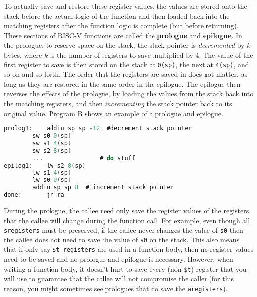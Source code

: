 \documentclass{article}
\begin{document}
To actually save and restore these register values, the values are stored onto the stack before the actual logic of the function and then loaded back into the matching registers after the function logic is complete (but before returning). These sections of RISC-V functions are called the \textbf{prologue} and \textbf{epilogue}. In the prologue, to reserve space on the stack, the stack pointer is \textit{decremented} by $k$ bytes, where $k$ is the number of registers to save multiplied by 4. The value of the first register to save is then stored on the stack at \texttt{0(sp)}, the next at \texttt{4(sp)}, and so on and so forth. The order that the registers are saved in does not matter, as long as they are restored in the same order in the epilogue. The epilogue then reverses the effects of the prologue, by loading the values from the stack back into the matching registers, and then \textit{incrementing} the stack pointer back to its original value. Program B shows an example of a prologue and epilogue.
\begin{center}
\renewcommand{\ttdefault}{pcr}
\begin{lstlisting}[language=C, basicstyle=\ttfamily, keywordstyle=\bfseries, showstringspaces=false, morekeywords={jal, addu, move, bne, j, sw, addiu, lw, jr}]
prolog1:  	addiu sp sp -12  #decrement stack pointer
		sw s0 0(sp)
		sw s1 4(sp)
		sw s2 8(sp)
		... 			   # do stuff
epilog1:	lw s2 8(sp)
		lw s1 4(sp)
		lw s0 0(sp)
		addiu sp sp 8  # increment stack pointer
done:		jr ra 
\end{lstlisting}
\end{center}
During the prologue, the callee need only save the register values of the registers that the callee will change during the function call. For example, even though all \texttt{sregisters} must be preserved, if the callee never changes the value of \texttt{s0} then the callee does not need to save the value of \texttt{s0} on the stack. This also means that if only say \texttt{\$t registers} are used in a function body, then no register values need to be saved and no prologue and epilogue is necessary. However, when writing a function body, it doesn't hurt to save every (non \texttt{\$t}) register that you will use to guarantee that the callee will not compromise the caller (for this reason, you might sometimes see prologues that do save the \texttt{aregisters}).
\end{document}
